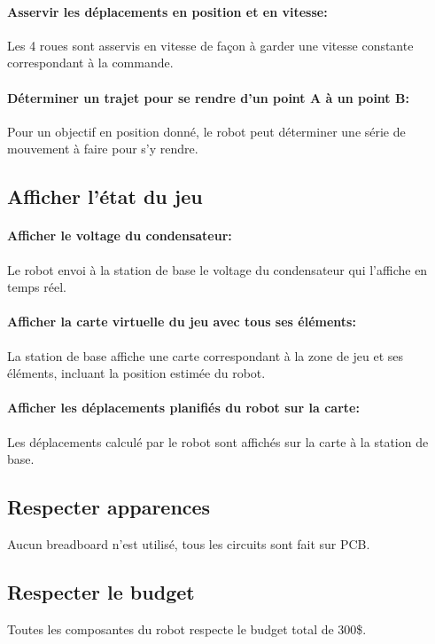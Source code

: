 \paragraph{Asservir les déplacements en position et en vitesse:}

Les 4 roues sont asservis en vitesse de façon à garder une vitesse constante correspondant à la commande.

\paragraph{Déterminer un trajet pour se rendre d'un point A à un point B:}

Pour un objectif en position donné, le robot peut déterminer une série de mouvement à faire pour s'y rendre.

\subsection{Afficher l'état du jeu}

\paragraph{Afficher le voltage du condensateur:}

Le robot envoi à la station de base le voltage du condensateur qui l'affiche en temps réel.

\paragraph{Afficher la carte virtuelle du jeu avec tous ses éléments:}

La station de base affiche une carte correspondant à la zone de jeu et ses éléments, incluant la position estimée du robot.

\paragraph{Afficher les déplacements planifiés du robot sur la carte:}

Les déplacements calculé par le robot sont affichés sur la carte à la station de base.

\subsection{Respecter apparences}

Aucun breadboard n'est utilisé, tous les circuits sont fait sur PCB.

\subsection{Respecter le budget}

Toutes les composantes du robot respecte le budget total de 300\$.
